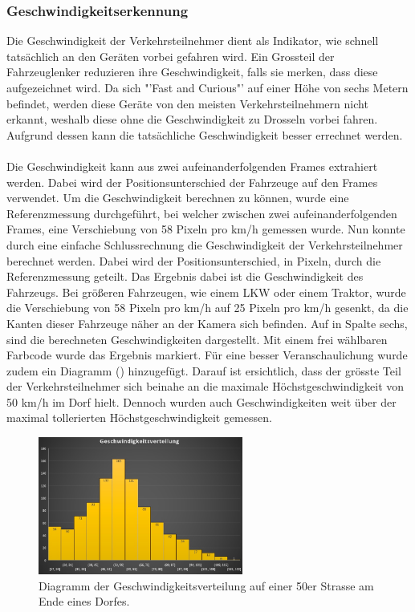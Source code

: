 \subsubsection{Geschwindigkeitserkennung}
Die Geschwindigkeit der Verkehrsteilnehmer dient als Indikator, wie schnell tatsächlich an den Geräten vorbei gefahren wird. Ein Grossteil der Fahrzeuglenker reduzieren ihre Geschwindigkeit, falls sie merken, dass diese aufgezeichnet wird. Da sich "'Fast and Curious"' auf einer Höhe von sechs Metern befindet, werden diese Geräte von den meisten Verkehrsteilnehmern nicht erkannt, weshalb diese ohne die Geschwindigkeit zu Drosseln vorbei fahren. Aufgrund dessen kann die tatsächliche Geschwindigkeit besser errechnet werden.\\\\
Die Geschwindigkeit kann aus zwei aufeinanderfolgenden Frames extrahiert werden. Dabei wird der Positionsunterschied der Fahrzeuge auf den Frames verwendet. Um die Geschwindigkeit berechnen zu können, wurde eine Referenzmessung durchgeführt, bei welcher zwischen zwei aufeinanderfolgenden Frames, eine Verschiebung von 58 Pixeln pro km/h gemessen wurde. Nun konnte durch eine einfache Schlussrechnung die Geschwindigkeit der Verkehrsteilnehmer berechnet werden. Dabei wird der Positionsunterschied, in Pixeln, durch die Referenzmessung geteilt. Das Ergebnis dabei ist die Geschwindigkeit des Fahrzeugs. Bei größeren Fahrzeugen, wie einem LKW oder einem Traktor, wurde die Verschiebung von 58 Pixeln pro km/h auf 25 Pixeln pro km/h gesenkt, da die Kanten dieser Fahrzeuge näher an der Kamera sich befinden. Auf  in Spalte sechs, sind die berechneten Geschwindigkeiten dargestellt. Mit einem frei wählbaren Farbcode wurde das Ergebnis markiert. Für eine besser Veranschaulichung wurde zudem ein Diagramm () hinzugefügt. Darauf ist ersichtlich, dass der grösste Teil der Verkehrsteilnehmer sich beinahe an die maximale Höchstgeschwindigkeit von  50 km/h  im Dorf hielt. Dennoch wurden auch Geschwindigkeiten weit über der maximal tollerierten Höchstgeschwindigkeit gemessen.

\begin{figure}[H]
  \centering
  \includegraphics[width=0.6\textwidth]{Resultate/GeschwDiagramm.jpg} 
  \caption{Diagramm der Geschwindigkeitsverteilung auf einer 50er Strasse am Ende eines Dorfes.}
  \label{bGeschwDiagramm}
\end{figure}


